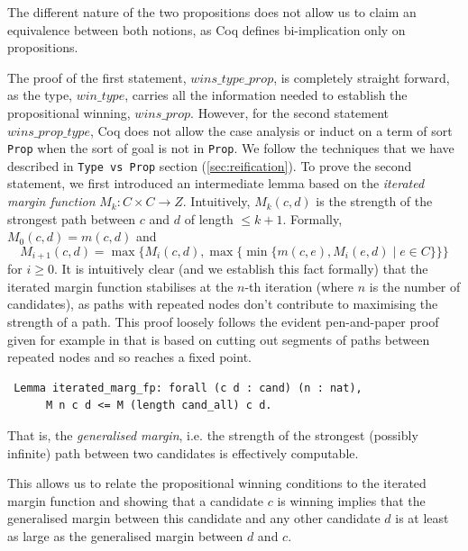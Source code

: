 \noindent
The different nature of the two propositions does not allow
us to claim an equivalence between both notions, as Coq defines
bi-implication only on propositions.

The proof of the first statement, $wins\_type\_prop$, is completely straight forward, as
the type, $win\_type$, carries all the information needed to establish the
propositional winning, $wins\_prop$. However, for the second statement 
$wins\_prop\_type$, Coq does not allow the 
case analysis or induct on a term of sort \texttt{Prop} when the sort of goal 
is not in \texttt{Prop}. We follow the techniques that we have described in 
\texttt{Type vs Prop} section (\ref{sec:reification}).
%
\noindent
To prove the second statement, we first introduced an 
intermediate lemma based on the \emph{iterated margin
function}
$M_k: C \times C \to Z$. Intuitively, $M_k (c, d)$ is the
strength of the strongest path between $c$ and $d$ of length $\leq
k+1$. Formally,
$M_0 (c, d) = m(c, d)$ and
\[ M_{i+1}(c, d) = \max \lbrace M_i(c, d), \max \lbrace  \min
\lbrace m(c, e), M_i(e, d) \mid e \in C \rbrace \rbrace \rbrace
\] for $i \geq 0$. 
It is intuitively clear (and we establish this fact formally) that
the iterated margin function stabilises at the $n$-th iteration
(where $n$ is the number of candidates), as paths with repeated
nodes don't contribute to maximising the strength of a path. This
proof loosely follows the evident pen-and-paper proof given for
example in
\citep{Carre:1971:ANR} that is based on cutting out segments of paths
between repeated nodes and so reaches a fixed point.

\begin{verbatim}
 Lemma iterated_marg_fp: forall (c d : cand) (n : nat),
      M n c d <= M (length cand_all) c d.
\end{verbatim}


\noindent
That is, the \emph{generalised margin}, i.e. the strength of the strongest (possibly infinite) path
between two candidates is effectively computable.

This allows us to relate the propositional winning conditions to the
iterated margin function and showing that a candidate $c$ is winning
implies that the generalised margin between this candidate and any
other candidate $d$ is at least as large as the generalised margin between $d$
and $c$.

